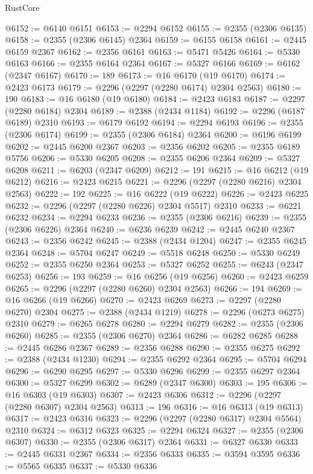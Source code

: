 \begin{lexlean}{RustCore}
\begin{coremodule}
@6152 := @6140 @6151
@6153 := @2294 @6152
@6155 := @2355 (@2306 @6135)
@6158 := @2355 (@2306 @6145) @2364
@6159 := @6155 @6158
@6161 := @2445 @6159 @2367
@6162 := @2356 @6161
@6163 := @5471 @5426
@6164 := @5330 @6163
@6166 := @2355 @6164 @2364
@6167 := @5327 @6166
@6169 := @6162 (@2347 @6167)
@6170 := 189
@6173 := @16 @6170 (@19 @6170)
@6174 := @2423 @6173
@6179 := @2296 (@2297 (@2280 @6174) @2304 @2563)
@6180 := 190
@6183 := @16 @6180 (@19 @6180)
@6184 := @2423 @6183
@6187 := @2297 (@2280 @6184) @2304
@6189 := @2388 (@2434 @1184)
@6192 := @2296 (@6187 @6189) @2310
@6193 := @6179 @6192
@6194 := @2294 @6193
@6196 := @2355 (@2306 @6174)
@6199 := @2355 (@2306 @6184) @2364
@6200 := @6196 @6199
@6202 := @2445 @6200 @2367
@6203 := @2356 @6202
@6205 := @2355 @6189 @5756
@6206 := @5330 @6205
@6208 := @2355 @6206 @2364
@6209 := @5327 @6208
@6211 := @6203 (@2347 @6209)
@6212 := 191
@6215 := @16 @6212 (@19 @6212)
@6216 := @2423 @6215
@6221 := @2296 (@2297 (@2280 @6216) @2304 @2563)
@6222 := 192
@6225 := @16 @6222 (@19 @6222)
@6226 := @2423 @6225
@6232 := @2296 (@2297 (@2280 @6226) @2304 @5517) @2310
@6233 := @6221 @6232
@6234 := @2294 @6233
@6236 := @2355 (@2306 @6216)
@6239 := @2355 (@2306 @6226) @2364
@6240 := @6236 @6239
@6242 := @2445 @6240 @2367
@6243 := @2356 @6242
@6245 := @2388 (@2434 @1204)
@6247 := @2355 @6245 @2364
@6248 := @5704 @6247
@6249 := @5518 @6248
@6250 := @5330 @6249
@6252 := @2355 @6250 @2364
@6253 := @5327 @6252
@6255 := @6243 (@2347 @6253)
@6256 := 193
@6259 := @16 @6256 (@19 @6256)
@6260 := @2423 @6259
@6265 := @2296 (@2297 (@2280 @6260) @2304 @2563)
@6266 := 194
@6269 := @16 @6266 (@19 @6266)
@6270 := @2423 @6269
@6273 := @2297 (@2280 @6270) @2304
@6275 := @2388 (@2434 @1219)
@6278 := @2296 (@6273 @6275) @2310
@6279 := @6265 @6278
@6280 := @2294 @6279
@6282 := @2355 (@2306 @6260)
@6285 := @2355 (@2306 @6270) @2364
@6286 := @6282 @6285
@6288 := @2445 @6286 @2367
@6289 := @2356 @6288
@6290 := @2355 @6275
@6292 := @2388 (@2434 @1230)
@6294 := @2355 @6292 @2364
@6295 := @5704 @6294
@6296 := @6290 @6295
@6297 := @5330 @6296
@6299 := @2355 @6297 @2364
@6300 := @5327 @6299
@6302 := @6289 (@2347 @6300)
@6303 := 195
@6306 := @16 @6303 (@19 @6303)
@6307 := @2423 @6306
@6312 := @2296 (@2297 (@2280 @6307) @2304 @2563)
@6313 := 196
@6316 := @16 @6313 (@19 @6313)
@6317 := @2423 @6316
@6323 := @2296 (@2297 (@2280 @6317) @2304 @5564) @2310
@6324 := @6312 @6323
@6325 := @2294 @6324
@6327 := @2355 (@2306 @6307)
@6330 := @2355 (@2306 @6317) @2364
@6331 := @6327 @6330
@6333 := @2445 @6331 @2367
@6334 := @2356 @6333
@6335 := @3594 @3595
@6336 := @5565 @6335
@6337 := @5330 @6336

\end{coremodule}
\end{lexlean}
